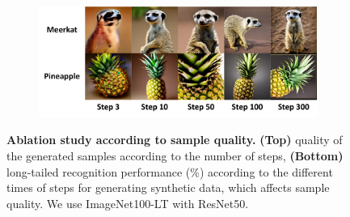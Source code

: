 \begin{figure}[t]
    \begin{subfigure}[c]{0.9\linewidth}
        \centering
        \includegraphics[width=1.0\linewidth]{figures/stepqual_vis.pdf}
    \end{subfigure}
    \centering
    \begin{subtable}[c]{0.9\linewidth}
    \end{subtable}
\caption{\textbf{Ablation study according to sample quality.}
\textbf{(Top)} quality of the generated samples according to the number of steps, \textbf{(Bottom)} long-tailed recognition performance (\%) 
according to the different times of steps for generating synthetic data, which affects sample quality.
We use ImageNet100-LT with ResNet50.
}
\label{fig:imagenet100_lt}
\end{figure}









